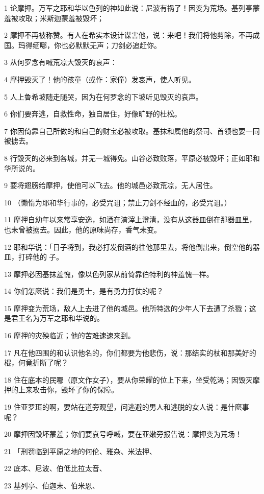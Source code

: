 \par 1 论摩押。万军之耶和华以色列的神如此说：尼波有祸了！因变为荒场。基列亭蒙羞被攻取；米斯迦蒙羞被毁坏；
\par 2 摩押不再被称赞。有人在希实本设计谋害他，说：来吧！我们将他剪除，不再成国。玛得缅哪，你也必默默无声；刀剑必追赶你。
\par 3 从何罗念有喊荒凉大毁灭的哀声：
\par 4 摩押毁灭了！他的孩童（或作：家僮）发哀声，使人听见。
\par 5 人上鲁希坡随走随哭，因为在何罗念的下坡听见毁灭的哀声。
\par 6 你们要奔逃，自救性命，独自居住，好像旷野的杜松。
\par 7 你因倚靠自己所做的和自己的财宝必被攻取。基抹和属他的祭司、首领也要一同被掳去。
\par 8 行毁灭的必来到各城，并无一城得免。山谷必致败落，平原必被毁坏；正如耶和华所说的。
\par 9 要将翅膀给摩押，使他可以飞去。他的城邑必致荒凉，无人居住。
\par 10 （懒惰为耶和华行事的，必受咒诅；禁止刀剑不经血的，必受咒诅。）
\par 11 摩押自幼年以来常享安逸，如酒在渣滓上澄清，没有从这器皿倒在那器皿里，也未曾被掳去。因此，他的原味尚存，香气未变。
\par 12 耶和华说：「日子将到，我必打发倒酒的往他那里去，将他倒出来，倒空他的器皿，打碎他的子。
\par 13 摩押必因基抹羞愧，像以色列家从前倚靠伯特利的神羞愧一样。
\par 14 你们怎麽说：我们是勇士，是有勇力打仗的呢？
\par 15 摩押变为荒场，敌人上去进了他的城邑。他所特选的少年人下去遭了杀戮；这是君王名为万军之耶和华说的。
\par 16 摩押的灾殃临近；他的苦难速速来到。
\par 17 凡在他四围的和认识他名的，你们都要为他悲伤，说：那结实的杖和那美好的棍，何竟折断了呢？
\par 18 住在底本的民哪（原文作女子），要从你荣耀的位上下来，坐受乾渴；因毁灭摩押的上来攻击你，毁坏了你的保障。
\par 19 住亚罗珥的啊，要站在道旁观望，问逃避的男人和逃脱的女人说：是什麽事呢？
\par 20 摩押因毁坏蒙羞；你们要哀号呼喊，要在亚嫩旁报告说：摩押变为荒场！
\par 21 「刑罚临到平原之地的何伦、雅杂、米法押、
\par 22 底本、尼波、伯低比拉太音、
\par 23 基列亭、伯迦末、伯米恩、
